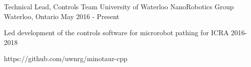 \begin{cventries}

\cventrylink
{Technical Lead, Controls Team}
{University of Waterloo NanoRobotics Group}
{Waterloo, Ontario}
{May 2016 - Present} %
{ %
Led development of the controls software for microrobot pathing for ICRA 2016-2018
\begin{cvitems}
\end{cvitems}
}
{https://github.com/uwnrg/minotaur-cpp}

\end{cventries}
